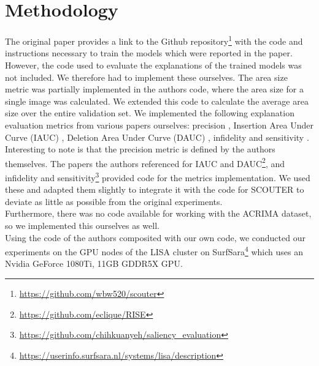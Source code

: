 
\section{Methodology}
The original paper provides a link to the Github repository\footnote{\url{https://github.com/wbw520/scouter}} with the code and instructions necessary to train the models which were reported in the paper. However, the code used to evaluate the explanations of the trained models was not included. We therefore had to implement these ourselves. The area size metric was partially implemented in the authors code, where the area size for a single image was calculated. We extended this code to calculate the average area size over the entire validation set. We implemented the following explanation evaluation metrics from various papers ourselves: precision \cite{scouter}, Insertion Area Under Curve (IAUC) \cite{rise}, Deletion Area Under Curve (DAUC) \cite{rise}, infidelity \cite{fidelity} and sensitivity \cite{fidelity}. Interesting to note is that the precision metric is defined by the authors themselves. The papers the authors referenced for IAUC and DAUC\footnote{\url{https://github.com/eclique/RISE}}, and infidelity and sensitivity\footnote{\url{ https://github.com/chihkuanyeh/saliency_evaluation}} provided code for the metrics implementation. We used these and adapted them slightly to integrate it with the code for SCOUTER to deviate as little as possible from the original experiments.
\\
Furthermore, there was no code available for working with the ACRIMA dataset, so we implemented this ourselves as well. %
\\
Using the code of the authors composited with our own code, we conducted our experiments on the GPU nodes of the LISA cluster on SurfSara\footnote{\url{https://userinfo.surfsara.nl/systems/lisa/description}} which uses an Nvidia GeForce 1080Ti, 11GB GDDR5X GPU.
\\

